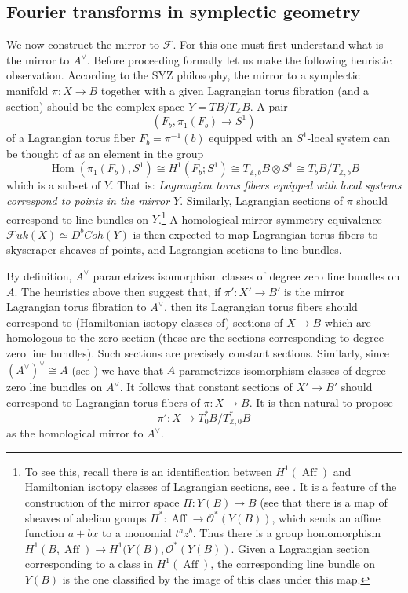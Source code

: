 \documentclass[10pt]{amsart}
\theoremstyle{definition}
\theoremstyle{remark}
\def\Z{\mathbb{Z}}
\DeclareMathOperator{\Aff}{Aff}
\DeclareMathOperator{\Hom}{Hom}
\def\inv{^{-1}}
\newcommand{\mcal}{\mathcal}
\begin{document}
\subsection{Fourier transforms in symplectic geometry}\label{sec:symplecticfourier}
We now construct the mirror to $\mcal F$.
For this one must first understand what is the mirror to $A^\vee$.
Before proceeding formally let us make the following heuristic observation.
According to the SYZ philosophy, the mirror to a symplectic manifold $\pi:X \to B$ together with a given Lagrangian torus fibration (and a section) should be the complex space $Y = TB/T_\Z B$.
A pair 
$$
(F_b,\pi_1(F_b)\to S^1)
$$
of a Lagrangian torus fiber $F_b = \pi\inv(b)$ equipped with an $S^1$-local system can be thought of as an element in the group
$$
\Hom(\pi_1(F_b),S^1) \cong H^1(F_b;S^1) \cong T_{\Z,b} B \otimes S^1 \cong T_b B / T_{\Z,b} B
$$
which is a subset of $Y$.
That is: \emph{Lagrangian torus fibers equipped with local systems correspond to points in the mirror $Y$}.
Similarly, Lagrangian sections of $\pi$ should correspond to line bundles on $Y$.\footnote{To see this, recall there is an identification between $H^1(\Aff)$ and Hamiltonian isotopy classes of Lagrangian sections, see .
It is a feature of the construction of the mirror space $\Pi: Y(B) \to B$ (see \cite[Section 2]{abouzaid2014family} that there is a map of sheaves of abelian groups $\Pi^*: \Aff \to \mcal O^*(Y(B))$, which sends an affine function $a + bx$ to a monomial $t^a z^b$. Thus there is a group homomorphism $H^1(B,\Aff) \to H^1(Y(B),\mcal O^*(Y(B))$. Given a Lagrangian section corresponding to a class in $H^1(\Aff)$, the corresponding line bundle on $Y(B)$ is the one classified by the image of this class under this map.} 
A homological mirror symmetry equivalence $\mcal Fuk(X) \simeq D^bCoh(Y)$ is then expected to map Lagrangian torus fibers to skyscraper sheaves of points, and Lagrangian sections to line bundles. 
 

By definition, $A^\vee$ parametrizes isomorphism classes of degree zero line bundles on $A$.
The heuristics above then suggest that, if $\pi':X' \to B'$ is the mirror Lagrangian torus fibration to $A^\vee$, then its Lagrangian torus fibers should correspond to (Hamiltonian isotopy classes of) sections of $X \to B$ which are homologous to the zero-section (these are the sections corresponding to degree-zero line bundles).
Such sections are precisely constant sections.
Similarly, since $(A^\vee)^\vee \cong A$ (see ) we have that $A$ parametrizes isomorphism classes of degree-zero line bundles on $A^\vee$.
It follows that constant sections of $X' \to B'$ should correspond to Lagrangian torus fibers of $\pi:X \to B$.
It is then natural to propose
$$
\pi':X \to T_0^*B/T_{\Z,0}^*B
$$
as the homological mirror to $A^\vee$.
\end{document}
